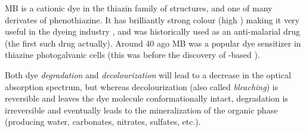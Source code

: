 \documentclass[webedition,openright,titles,swedish,english]{LuaUUThesis}\usepackage[]{graphicx}\usepackage[]{xcolor}
\newcommand{\etc}{etc.}
\begin{document}
\gls{MB} is a cationic dye in the thiazin family of structures, and one of many
derivates of phenothiazine. It has brilliantly strong colour (high )
making it very useful in the dyeing industry \cite{Tayade2009}, and was historically
used as an anti-malarial drug (the first such drug actually).
Around \qty{40}{\years} ago \gls{MB} was a popular dye sensitizer in thiazine
photogalvanic cells \cite{Mills1999}
(this was before the discovery of -based ).

Both dye \emph{degradation} and \emph{decolourization} will lead to a decrease in the optical
absorption spectrum, but whereas decolourization (also called \emph{bleaching}) is reversible
and leaves the dye molecule conformationally intact, degradation is irreversible and
eventually leads to the mineralization of the organic phase
(producing water, carbonates, nitrates, sulfates, \etc).
\end{document}
